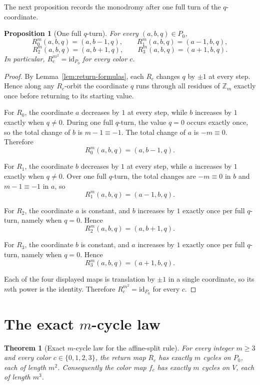\documentclass[11pt]{article}
\newtheorem{proposition}[lemma]{Proposition}
\newtheorem{theorem}[lemma]{Theorem}
\theoremstyle{definition}
\theoremstyle{remark}
\newcommand{\Zm}{\mathbb Z_m}
\begin{document}
The next proposition records the monodromy after one full turn of the $q$-coordinate.

\begin{proposition}[One full $q$-turn]\label{prop:monodromy}
For every $(a,b,q)\in P_0$,
\[
R_0^m(a,b,q)=(a,b-1,q),
\qquad
R_1^m(a,b,q)=(a-1,b,q),
\]
\[
R_2^m(a,b,q)=(a,b+1,q),
\qquad
R_3^m(a,b,q)=(a+1,b,q).
\]
In particular, $R_c^{m^2}=\mathrm{id}_{P_0}$ for every color $c$.
\end{proposition}

\begin{proof}
By Lemma~\ref{lem:return-formulas}, each $R_c$ changes $q$ by $\pm 1$ at every step. Hence along any $R_c$-orbit the coordinate $q$ runs through all residues of $\Zm$ exactly once before returning to its starting value.

For $R_0$, the coordinate $a$ decreases by $1$ at every step, while $b$ increases by $1$ exactly when $q\neq 0$. During one full $q$-turn, the value $q=0$ occurs exactly once, so the total change of $b$ is $m-1\equiv -1$. The total change of $a$ is $-m\equiv 0$. Therefore
\[
R_0^m(a,b,q)=(a,b-1,q).
\]

For $R_1$, the coordinate $b$ decreases by $1$ at every step, while $a$ increases by $1$ exactly when $q\neq 0$. Over one full $q$-turn, the total changes are $-m\equiv 0$ in $b$ and $m-1\equiv -1$ in $a$, so
\[
R_1^m(a,b,q)=(a-1,b,q).
\]

For $R_2$, the coordinate $a$ is constant, and $b$ increases by $1$ exactly once per full $q$-turn, namely when $q=0$. Hence
\[
R_2^m(a,b,q)=(a,b+1,q).
\]

For $R_3$, the coordinate $b$ is constant, and $a$ increases by $1$ exactly once per full $q$-turn, namely when $q=0$. Hence
\[
R_3^m(a,b,q)=(a+1,b,q).
\]

Each of the four displayed maps is translation by $\pm 1$ in a single coordinate, so its $m$th power is the identity. Therefore $R_c^{m^2}=\mathrm{id}_{P_0}$ for every $c$.
\end{proof}

\section{The exact $m$-cycle law}

\begin{theorem}[Exact $m$-cycle law for the affine-split rule]\label{thm:m-cycle-law}
For every integer $m\ge 3$ and every color $c\in\{0,1,2,3\}$, the return map $R_c$ has exactly $m$ cycles on $P_0$, each of length $m^2$. Consequently the color map $f_c$ has exactly $m$ cycles on $V$, each of length $m^3$.
\end{theorem}
\end{document}
